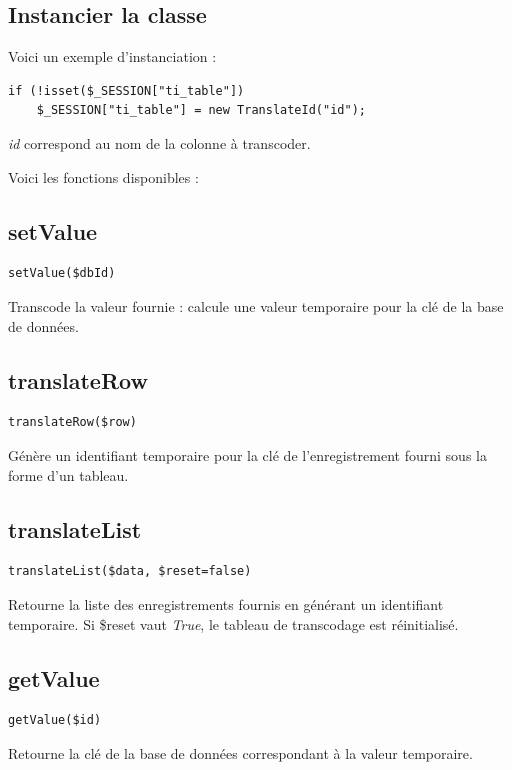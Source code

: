 \subsection{Instancier la classe}
Voici un exemple d'instanciation :
\begin{lstlisting}
if (!isset($_SESSION["ti_table"]) 
	$_SESSION["ti_table"] = new TranslateId("id");
\end{lstlisting}

\textit{id} correspond au nom de la colonne à transcoder.

Voici les fonctions disponibles :

\subsection{setValue}
\begin{lstlisting}
setValue($dbId)
\end{lstlisting}
Transcode la valeur fournie : calcule une valeur temporaire pour la clé de la base de données.

\subsection{translateRow}
\begin{lstlisting}
translateRow($row)
\end{lstlisting}

Génère un identifiant temporaire pour la clé de l'enregistrement fourni sous la forme d'un tableau.

\subsection{translateList}
\begin{lstlisting}
translateList($data, $reset=false)
\end{lstlisting}
Retourne la liste des enregistrements fournis en générant un identifiant temporaire. Si \$reset vaut \textit{True}, le tableau de transcodage est réinitialisé.

\subsection{getValue}
\begin{lstlisting}
getValue($id)
\end{lstlisting}

Retourne la clé de la base de données correspondant à la valeur temporaire.

